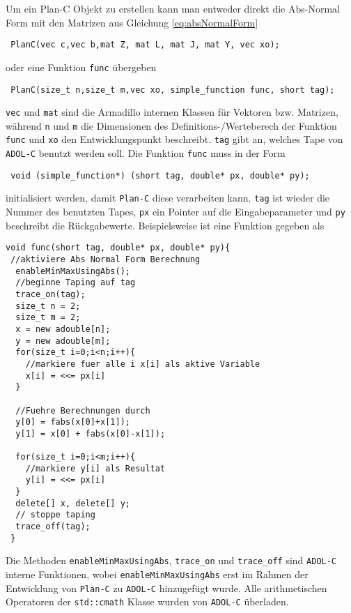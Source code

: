Um ein Plan-C Objekt zu erstellen kann man entweder direkt die Abs-Normal Form mit den Matrizen aus Gleichung  \eqref{eq:absNormalForm} 
\begin{lstlisting}
 PlanC(vec c,vec b,mat Z, mat L, mat J, mat Y, vec xo);
\end{lstlisting}
oder eine Funktion \texttt{func} übergeben
\begin{lstlisting}
 PlanC(size_t n,size_t m,vec xo, simple_function func, short tag);
\end{lstlisting}
\texttt{vec} und \texttt{mat} sind die Armadillo internen Klassen für Vektoren bzw. Matrizen, während \texttt{n} und \texttt{m} die Dimensionen des Definitions-/Werteberech der Funktion \texttt{func} und \texttt{xo} den Entwicklungspunkt beschreibt. \texttt{tag} gibt an, welches Tape von \texttt{ADOL-C} benutzt werden soll. 
Die Funktion \texttt{func} muss in der Form 
\begin{lstlisting}
 void (simple_function*) (short tag, double* px, double* py);
\end{lstlisting}
initialisiert werden, damit \texttt{Plan-C} diese verarbeiten kann. \texttt{tag} ist wieder die Nummer des benutzten Tapes,  \texttt{px} ein Pointer auf die Eingabeparameter und \texttt{py} beschreibt die Rückgabewerte. 
Beispielsweise ist eine Funktion gegeben als
\begin{lstlisting}[caption=Beispiel einer simple\_function,label=lst:simpleFunc]
 void func(short tag, double* px, double* py){
 //aktiviere Abs Normal Form Berechnung
  enableMinMaxUsingAbs();
  //beginne Taping auf tag
  trace_on(tag);
  size_t n = 2;
  size_t m = 2;
  x = new adouble[n];
  y = new adouble[m];
  for(size_t i=0;i<n;i++){
    //markiere fuer alle i x[i] als aktive Variable
    x[i] = <<= px[i]		
  }
  
  //Fuehre Berechnungen durch
  y[0] = fabs(x[0]+x[1]);
  y[1] = x[0] + fabs(x[0]-x[1]);
  
  for(size_t i=0;i<m;i++){
    //markiere y[i] als Resultat
    y[i] = <<= px[i]		
  }
  delete[] x, delete[] y;
  // stoppe taping
  trace_off(tag); 
 }
\end{lstlisting}

Die Methoden \texttt{enableMinMaxUsingAbs}, \texttt{trace\_on} und \texttt{trace\_off} sind \texttt{ADOL-C} interne Funktionen, wobei \texttt{enableMinMaxUsingAbs} erst im Rahmen der Entwicklung von \texttt{Plan-C} zu \texttt{ADOL-C} hinzugefügt wurde. Alle arithmetischen Operatoren der \texttt{std::cmath} Klasse wurden von \texttt{ADOL-C} überladen.

